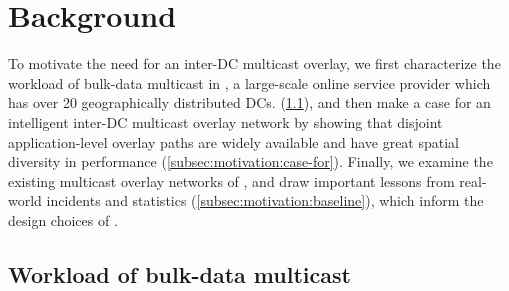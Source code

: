 \section{Background}
\label{sec:motivation}


To motivate the need for an inter-DC multicast overlay,
we first characterize the workload of bulk-data multicast in
\company, a large-scale online service provider which has over
20 geographically distributed DCs.
(\Section\ref{subsec:motivation:multicast-traffic}),
and then make a case for an intelligent inter-DC multicast
overlay network by showing that disjoint application-level
overlay paths are widely available and have great spatial
diversity in performance
(\Section\ref{subsec:motivation:case-for}).
Finally, we examine the existing multicast overlay networks
of \company, and draw important lessons from real-world incidents
and statistics (\Section\ref{subsec:motivation:baseline}),
which inform the design choices of \name.


\subsection{Workload of bulk-data multicast}
\label{subsec:motivation:multicast-traffic}

